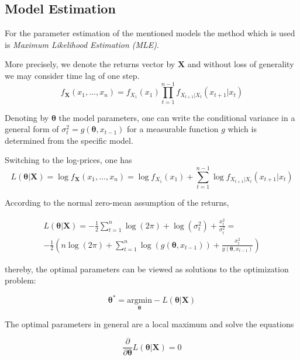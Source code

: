 \documentclass[a4paper, oneside]{discothesis}
\begin{document}
\subsection{Model Estimation}

For the parameter estimation of the mentioned models the method which is used is \textit{Maximum Likelihood Estimation (MLE)}.

More precisely, we denote the returns vector by $\mathbf{X}$ and without loss of generality we may consider time lag of one step. 
\begin{equation}
    f_{\bm{X}}(x_1, \dots, x_n) = f_{X_1}(x_1)\prod_{t=1}^{n-1}f_{X_{t+1}|X_t}(x_{t+1}|x_t)
\end{equation}


Denoting by $\bm{\theta}$ the model parameters, one can write the conditional variance in a general form of $\sigma_t^2 = g(\bm{\theta}, x_{t-1})$ for a measurable function $g$ which is determined from the specific model. 

Switching to the log-prices, one has
\begin{equation}
    L\left(\bm{\theta}| \bm{X}\right) = \log f_{\bm{X}}(x_1, \dots, x_n) = \log f_{X_1}(x_1) + \sum_{t=1}^{n-1} \log  f_{X_{t+1}|X_t}(x_{t+1}|x_t) 
\end{equation}

According to the normal zero-mean assumption of the returns,

\begin{equation}
\begin{split}
      L\left(\bm{\theta}| \bm{X}\right) = -\frac{1}{2}\sum_{t=1}^n \log(2\pi)+\log(\sigma_t^2)+\frac{x_t^2}{\sigma_t^2}=\\-\frac{1}{2}\left(n\log(2\pi)+\sum_{t=1}^n \log(g(\bm{\theta}, x_{t-1}))+\frac{x_t^2}{g(\bm{\theta}, x_{t-1})}\right)
\end{split}
\end{equation}

thereby, the optimal parameters can be viewed as solutions to the optimization problem:

\begin{equation}
    \bm{\theta}^* = \underset{\bm{\theta}}{\mathrm{argmin }} -L\left(\bm{\theta}| \bm{X}\right)
\end{equation}

The optimal parameters in general are a local maximum and solve the equations

\begin{equation}\label{eq:scores}
    \frac{\partial}{\partial\bm{\theta}}L\left(\bm{\theta}| \bm{X}\right) = 0
\end{equation}
\end{document}
